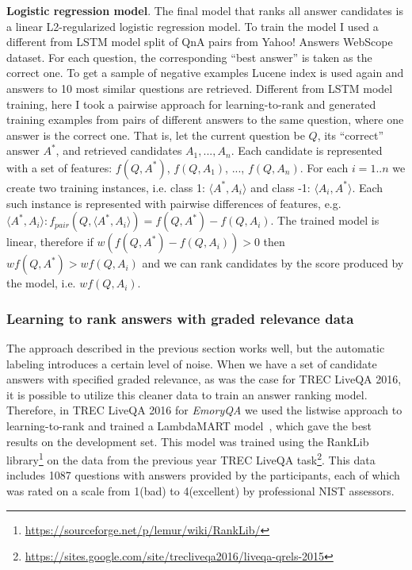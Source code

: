 \textbf{Logistic regression model}.
The final model that ranks all answer candidates is a linear L2-regularized logistic regression model.
To train the model I used a different from LSTM model split of QnA pairs from Yahoo! Answers WebScope dataset.
For each question, the corresponding ``best answer'' is taken as the correct one.
To get a sample of negative examples Lucene index is used again and answers to 10 most similar questions are retrieved.
Different from LSTM model training, here I took a pairwise approach for learning-to-rank and generated training examples from pairs of different answers to the same question, where one answer is the correct one.
That is, let the current question be $Q$, its ``correct'' answer $A^*$, and retrieved candidates $A_1, ..., A_n$.
Each candidate is represented with a set of features: $f(Q, A^*)$, $f(Q, A_1)$, ..., $f(Q, A_n)$.
For each $i=1..n$ we create two training instances, i.e. class 1: $\langle A^*, A_i\rangle$ and class -1: $\langle A_i, A^*\rangle$.
Each such instance is represented with pairwise differences of features, e.g. $\langle A^*, A_i\rangle: f_{pair}(Q, \langle A^*, A_i\rangle) = f(Q, A^*) - f(Q, A_i)$.
The trained model is linear, therefore if $w(f(Q, A^*) - f(Q, A_i)) > 0$ then $w f(Q, A^*) > w f(Q, A_i)$ and we can rank candidates by the score produced by the model, i.e. $w f(Q, A_i)$.

\subsubsection{Learning to rank answers with graded relevance data}
\label{table:non-factoid:system:rel_training}

The approach described in the previous section works well, but the automatic labeling introduces a certain level of noise.
When we have a set of candidate answers with specified graded relevance, as was the case for TREC LiveQA 2016, it is possible to utilize this cleaner data to train an answer ranking model.
Therefore, in TREC LiveQA 2016 for \textit{EmoryQA} we used the listwise approach to learning-to-rank and trained a LambdaMART model~\cite{burges2010ranknet}, which gave the best results on the development set.
This model was trained using the RankLib library\footnote{\href{url}{https://sourceforge.net/p/lemur/wiki/RankLib/}} on the data from the previous year TREC LiveQA task\footnote{\href{url}{https://sites.google.com/site/trecliveqa2016/liveqa-qrels-2015}}.
This data includes 1087 questions with answers provided by the participants, each of which was rated on a scale from 1(bad) to 4(excellent) by professional NIST assessors.



